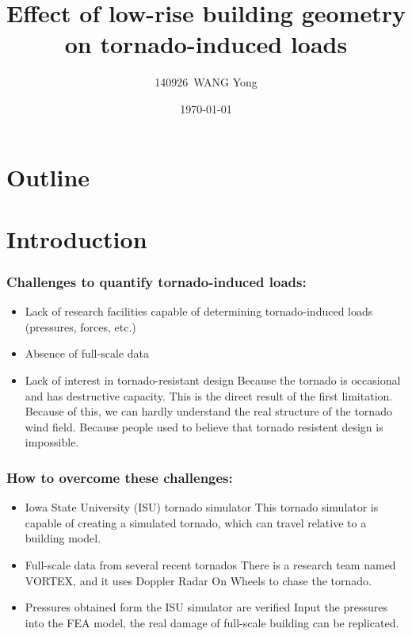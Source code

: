 \documentclass{beamer}
\title{Effect of low-rise building geometry on tornado-induced loads}
\author{140926~WANG Yong}
\institute{Southeast University}
\date{\today}
\begin{document}
\begin{frame}
	\titlepage
\end{frame}

\section*{Outline}
\begin{frame}
	\tableofcontents
\end{frame}

\section{Introduction}

\begin{frame}
    \frametitle{Challenges to quantify  tornado-induced loads:}
    \begin{itemize}
    	\item<1-> Lack of research facilities capable of determining tornado-induced loads (pressures, forces, etc.)
    	\item<2-> Absence of full-scale data
    	\item<3-> Lack of interest in tornado-resistant design
    		 {Because the tornado is occasional and has destructive capacity. }
    		 {This is the direct result of the first limitation. Because of this, we can hardly understand the real structure of the tornado wind field.}
    		 {Because people used to believe that tornado resistent design is impossible.}
    \end{itemize}
\end{frame}


\begin{frame}
    \frametitle{How to overcome these challenges:}
    \begin{itemize}
    	\item<1-> Iowa State University (ISU) tornado simulator
    		 {This tornado simulator is capable of creating a simulated tornado, which can travel relative to a building model.}
    	\item<2-> Full-scale data from several recent tornados
    		 {There is a research team named VORTEX, and it uses Doppler Radar On Wheels to chase the tornado.}
    	\item<3-> Pressures obtained form  the ISU simulator are verified
    	 	 {Input the pressures into the FEA model, the real damage of full-scale building can be replicated.}
    \end{itemize}
\end{frame}
\end{document}

